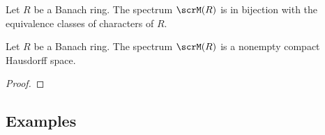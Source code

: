     \begin{proposition}\label{prop:spectrum_of_banach_rings_and_equivalence_class_of_characters}
        Let \(R\) be a Banach ring.
        The spectrum \(\scrM(R)\) is in bijection with the equivalence classes of characters of \(R\).
    \end{proposition}

    \begin{theorem}\label{thm:spectrum_of_Banach_rings_is_nonempty_compact_Hausdorff}
        Let \(R\) be a Banach ring.
        The spectrum \(\scrM(R)\) is a nonempty compact Hausdorff space.
    \end{theorem}
    \begin{proof}
    \end{proof}


\subsection{Examples}